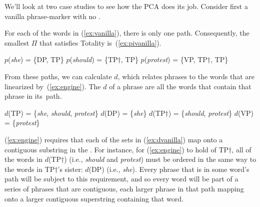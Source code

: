 \documentclass[output=paper]{langsci/langscibook}
\begin{document}
We'll look at two case studies to see how the \gls{PCA} does its job. Consider
first a vanilla phrase-marker with no .

\ea\label{ex:vanilla}
\z


For each of the words in (\ref{ex:vanilla}), there is only one path. Consequently, the smallest $\Pi$ that satisfies Totality is~(\ref{ex:pivanilla}).
\begin{exe}
	\ex \label{ex:pivanilla}
	\begin{xlist}
		\ex $p$(\emph{she}) = \{DP, TP\}
		\ex $p$(\emph{should}) = \{TP$\dag$, TP\}
		\ex $p$(\emph{protest}) = \{VP, TP$\dag$, TP\}
	\end{xlist}
\end{exe}

From these paths, we can calculate $d$, which relates phrases to the words that are linearized by~(\ref{ex:engine}). The $d$ of a phrase are all the words that contain that phrase in its~path.
\begin{exe}
	\ex \label{ex:dvanilla}
	\begin{xlist}
		\ex $d$(TP) = \{\emph{she}, \emph{should}, \emph{protest}\}
		\ex $d$(DP) = \{\emph{she}\}
		\ex $d$(TP$\dag$) = \{\emph{should}, \emph{protest}\}
		\ex $d$(VP) = \{\emph{protest}\}
	\end{xlist}
\end{exe}

(\ref{ex:engine}) requires that each of the sets in (\ref{ex:dvanilla}) map onto a contiguous substring in the . For instance, for (\ref{ex:engine}) to hold of TP$\dag$, all of the words in $d$(TP$\dag$) (i.e., \emph{should} and \emph{protest}) must be ordered in the same way to the words in TP$\dag$'s sister: $d$(DP) (i.e., \emph{she}). Every phrase that is in some word's path will be subject to this requirement, and so every word will be part of a series of phrases that are contiguous, each larger phrase in that path mapping onto a larger contiguous superstring containing that word.
\end{document}
